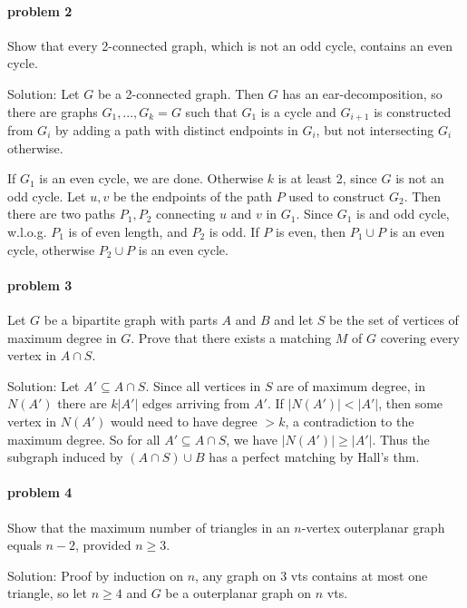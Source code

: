 \paragraph{problem 2}                           
    Show that every 2-connected graph, which is not an odd cycle, contains an
    even cycle.

    \smallskip \noindent
    Solution: Let $G$ be a 2-connected graph. Then $G$ has an ear-decomposition,
    so there are graphs $G_1,...,G_k = G$ such that $G_1$ is a cycle and 
    $G_{i+1}$ is constructed from $G_i$ by adding a path with distinct 
    endpoints in $G_i$, but not intersecting $G_i$ otherwise.

    \smallskip \noindent
    If $G_1$ is an even cycle, we are done. Otherwise $k$ is at least 2, since
    $G$ is not an odd cycle. Let $u,v$ be the endpoints of the path $P$ used 
    to construct $G_2$. Then there are two paths $P_1,P_2$ connecting $u$ and 
    $v$ in $G_1$. Since $G_1$ is and odd cycle, w.l.o.g. $P_1$ is of even 
    length, and $P_2$ is odd. If $P$ is even, then $P_1 \cup P$ is an even 
    cycle, otherwise $P_2 \cup P$ is an even cycle.


\paragraph{problem 3}
    Let $G$ be a bipartite graph with parts $A$ and $B$ and let $S$ be the set 
    of vertices of maximum degree in $G$. Prove that there exists a matching
    $M$ of $G$ covering every vertex in $A \cap S$.

    \smallskip \noindent
    Solution: Let $A' \subseteq A \cap S$. Since all vertices in $S$ are of 
    maximum degree, in $N(A')$ there are $k|A'|$ edges arriving from $A'$. 
    If $|N(A')| < |A'|$, then some vertex in $N(A')$ would need to have 
    degree $> k$, a contradiction to the maximum degree. So for all 
    $A' \subseteq A \cap S$, we have $|N(A')| \geq |A'|$. Thus the subgraph
    induced by $ (A \cap S) \cup B$ has a perfect matching by Hall's thm.


\paragraph{problem 4}
    Show that the maximum number of triangles in an $n$-vertex outerplanar 
    graph equals $n-2$, provided $n \geq 3$.  

    \smallskip \noindent
    Solution: Proof by induction on $n$, any graph on 3 vts contains at most 
    one triangle, so let $n \geq 4$ and $G$ be a outerplanar graph on $n$ vts.

